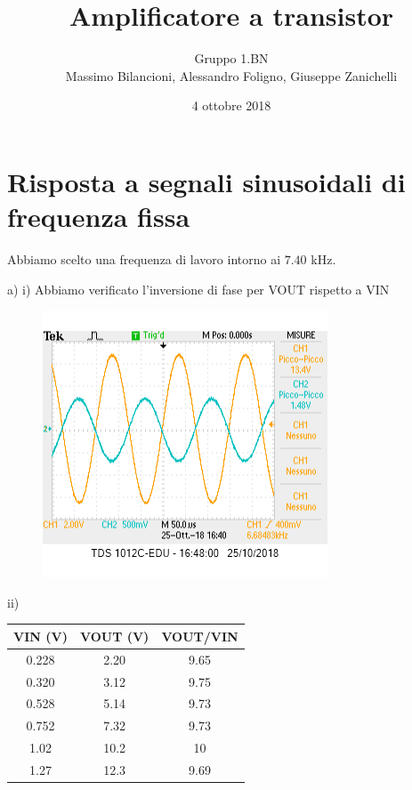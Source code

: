 \documentclass[10pt,a4paper]{article}
\author{Gruppo 1.BN \\ Massimo Bilancioni, Alessandro Foligno, Giuseppe Zanichelli }
\title{Amplificatore a transistor}
\begin{document}
\date{4 ottobre 2018}
\maketitle

\section{Risposta a segnali sinusoidali di frequenza fissa}

Abbiamo scelto una frequenza di lavoro intorno ai $7.40$ \si{\kilo\hertz}.

a) 
\vspace{0.5cm}
i)  Abbiamo verificato l'inversione di fase per VOUT rispetto a VIN

\begin{figure}[h]
	\centering
	\includegraphics[scale=0.5]{oscilloscopio.png}

	
	
\end{figure}

ii)
\begin{table}[h]
	\centering
	\begin{tabular}{|c|c|c|}
		\hline 
		 VIN (\si{\volt}) &  VOUT (\si{\volt})   & VOUT/VIN\\
		\hline 
	0.228 & 2.20& 9.65 \\
	0.320 & 3.12 & 9.75 \\
	0.528 & 5.14 & 9.73 \\
	0.752& 7.32 & 9.73\\
	1.02 & 10.2& 10 \\
	1.27& 12.3 & 9.69 \\
		\hline 
	\end{tabular} 
\end{table}
\end{document}

